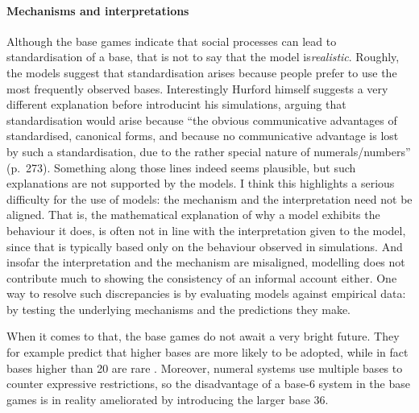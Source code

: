 \documentclass{../src/bcthesispart}
\begin{document}
\paragraph{Mechanisms and interpretations}


Although the base games indicate that social processes can lead to standardisation of a base, that is not to say that the model is\emph{realistic}.
Roughly, the models suggest that standardisation arises because people prefer to use the most frequently observed bases.
Interestingly Hurford himself suggests a very different explanation before introducint his simulations, arguing that standardisation would arise because “the obvious communicative advantages of standardised, canonical forms, and because no communicative advantage is lost by such a standardisation, due to the rather special nature of numerals/numbers” (p.~273).
Something along those lines indeed seems plausible, but such explanations are not supported by the models.
I think this highlights a serious difficulty for the use of models: the mechanism and the interpretation need not be aligned.
That is, the mathematical explanation of why a model exhibits the behaviour it does, is often not in line with the interpretation given to the model, since that is typically based only on the behaviour observed in simulations.
And insofar the interpretation and the mechanism are misaligned, modelling does not contribute much to showing the consistency of an informal account either.
One way to resolve such discrepancies is by evaluating models against empirical data: by testing the underlying mechanisms and the predictions they make.


When it comes to that, the base games do not await a very bright future.
They for example predict that higher bases are more likely to be adopted, while in fact bases higher than 20 are rare \parencite{Hammarstrom2009}.
Moreover, numeral systems use multiple bases to counter expressive restrictions, so the disadvantage of a base-6 system in the base games is in reality ameliorated by introducing the larger base 36.


\showbibliography
\end{document}
